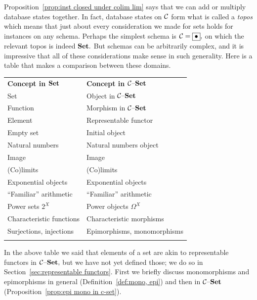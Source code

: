 \documentclass[CT4S-EN-RU]{subfiles}
\begin{document}
\begin{exerciseRUS}\label{exc:universal objects in C-set}
\end{exerciseRUS}

\begin{blockENG}
Proposition~\ref{prop:inst closed under colim lim} says that we can add or multiply database states together. In fact, database states on $\mathcal{C}$ form what is called a {\em topos} which means that just about every consideration we made for sets holds for instances on any schema. Perhaps the simplest schema is $\mathcal{C}=\fbox{$\bullet$},$ on which the relevant topos is indeed ${\mathbf{Set}}.$ But schemas can be arbitrarily complex, and it is impressive that all of these considerations make sense in such generality. Here is a table that makes a comparison between these domains.
\begin{center}
\begin{tabular}{| l | l |}\bhline
\multicolumn{2}{| c |}{Dictionary between $\Set$ and $\mcC\set$}\\\hline
{\bf Concept in $\Set$}&{\bf Concept in $\mcC\set$}\\\bbhline
Set & Object in $\mcC\set$\\\hline
Function & Morphism in $\mcC\set$\\\hline
Element&Representable functor\\\hline
Empty set & Initial object\\\hline
Natural numbers&Natural numbers object\\\hline
Image&Image\\\hline
(Co)limits&(Co)limits\\\hline
Exponential objects&Exponential objects\\\hline
“Familiar” arithmetic&“Familiar” arithmetic\\\hline
Power sets $2^X$&Power objects $\Omega^X$\\\hline
Characteristic functions&Characteristic morphisms\\\hline
Surjections, injections&Epimorphisms, monomorphisms\\\bhline
\end{tabular}
\end{center}
\end{blockENG}

\begin{blockRUS}
\end{blockRUS}

\begin{blockENG}
In the above table we said that elements of a set are akin to representable functors in $\mathcal{C}{\text \textendash}{\mathbf{Set}},$ but we have not yet defined those; we do so in Section~\ref{sec:representable functors}. First we briefly discuss monomorphisms and epimorphisms in general (Definition~\ref{def:mono, epi}) and then in $\mcC\set$ (Proposition~\ref{prop:epi mono in c-set}). 
\end{blockENG}
\end{document}
